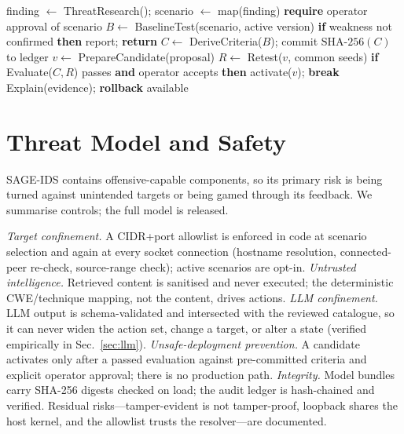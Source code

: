 \documentclass[journal]{IEEEtran}
\newcommand{\sage}{SAGE-IDS}
\begin{document}
\begin{algorithm}[t]
\caption{One evidence-gated adaptation cycle}
\label{alg:loop}
\begin{algorithmic}[1]
\State finding $\gets$ ThreatResearch(); scenario $\gets$ map(finding) 
\State \textbf{require} operator approval of scenario
\State $B \gets$ BaselineTest(scenario, active version) 
\State \textbf{if} weakness not confirmed \textbf{then} report; \textbf{return}
\State $C \gets$ DeriveCriteria($B$); commit $\mathrm{SHA\text{-}256}(C)$ to ledger
  \State $v \gets$ PrepareCandidate(proposal) 
  \State $R \gets$ Retest($v$, common seeds) 
  \State \textbf{if} Evaluate($C, R$) passes \textbf{and} operator accepts
  \State \quad \textbf{then} activate($v$); \textbf{break}
\EndFor
\State Explain(evidence); \textbf{rollback} available
\end{algorithmic}
\end{algorithm}

\section{Threat Model and Safety}
\label{sec:threat}
\sage{} contains offensive-capable components, so its primary risk is being turned against unintended
targets or being gamed through its feedback. We summarise controls; the full model is released.

\emph{Target confinement.} A CIDR+port allowlist is enforced in code at scenario selection and again at
every socket connection (hostname resolution, connected-peer re-check, source-range check); active
scenarios are opt-in. \emph{Untrusted intelligence.} Retrieved content is sanitised and never executed;
the deterministic CWE/technique mapping, not the content, drives actions. \emph{LLM confinement.} LLM
output is schema-validated and intersected with the reviewed catalogue, so it can never widen the
action set, change a target, or alter a state (verified empirically in Sec.~\ref{sec:llm}).
\emph{Unsafe-deployment prevention.} A candidate activates only after a passed evaluation against
pre-committed criteria and explicit operator approval; there is no production path. \emph{Integrity.}
Model bundles carry SHA-256 digests checked on load; the audit ledger is hash-chained and verified.
Residual risks---tamper-evident is not tamper-proof, loopback shares the host kernel, and the allowlist
trusts the resolver---are documented.
\end{document}
